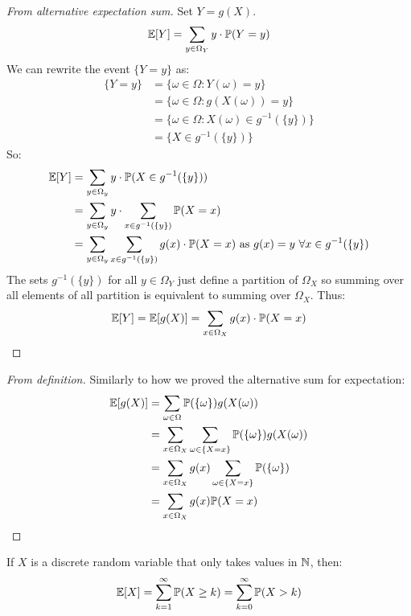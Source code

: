 \documentclass[../main.tex]{subfiles}
\begin{document}
\begin{proof}[From alternative expectation sum]
  Set $Y = g(X)$.
  \[
    \mathbb{E}[Y] = \sum_{y \in \Omega_Y} y \cdot \mathbb{P}(Y = y) \\
  \]
  We can rewrite the event $\{Y = y\}$ as:
  \begin{align*}
    \{Y = y\} &= \{\omega \in \Omega: Y(\omega) = y\} \\
              &= \{\omega \in \Omega: g(X(\omega)) = y\} \\
              &= \{\omega \in \Omega: X(\omega) \in g^{-1}(\{y\})\} \\
              &= \{X \in g^{-1}(\{y\})\}
  \end{align*}
  So:
  \begin{align*}
    \mathbb{E}[Y] &= \sum_{y \in \Omega_y} y \cdot \mathbb{P}(X \in g^{-1}(\{y\})) \\
          &= \sum_{y \in \Omega_y} y \cdot \sum_{x \in g^{-1}(\{y\})} \mathbb{P}(X = x) \\
          &= \sum_{y \in \Omega_y} \sum_{x \in g^{-1}(\{y\})} g(x) \cdot \mathbb{P}(X = x) \text{ as $g(x) = y\ \forall x \in g^{-1}(\{y\})$}
  \end{align*}
  The sets $g^{-1}(\{y\})$ for all $y \in \Omega_Y$ just define a partition of $\Omega_X$ so summing over all elements of all partition is equivalent to summing over $\Omega_X$.
  Thus:
  \[
    \mathbb{E}[Y] = \mathbb{E}[g(X)] = \sum_{x \in \Omega_X} g(x) \cdot \mathbb{P}(X = x)
  \]
\end{proof}
\begin{proof}[From definition]
  Similarly to how we proved the alternative sum for expectation:
  \begin{align*}
    \mathbb{E}[g(X)] &= \sum_{\omega \in \Omega} \mathbb{P}(\{\omega\}) g(X(\omega)) \\
             &= \sum_{x \in \Omega_X} \sum_{\omega \in \{X = x\}} \mathbb{P}(\{\omega\}) g(X(\omega)) \\
             &= \sum_{x \in \Omega_X} g(x) \sum_{\omega \in \{X = x\}} \mathbb{P}(\{\omega\}) \\
             &= \sum_{x \in \Omega_X} g(x) \mathbb{P}(X = x)
  \end{align*}
\end{proof}
\begin{lemma}
  If $X$ is a discrete random variable that only takes values in $\mathbb{N}$, then:
  \label{expDiscreteN}
  \[
    \mathbb{E}[X] = \sum_{k = 1}^{\infty} \mathbb{P}(X \geq k) = \sum_{k=0}^{\infty} \mathbb{P}(X > k)
  \]
\end{lemma}
\end{document}
